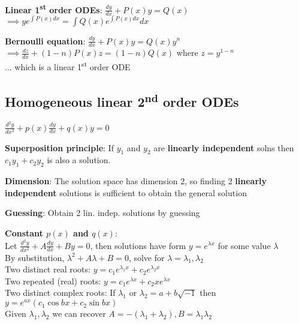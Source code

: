 \documentclass[a4paper,landscape]{article}
\newcommand{\rnsubtopic}[1]{\subsection*{#1}}
\newcommand{\rnname}[1]{\textbf{#1}}
\newcommand{\rnor}{\textrm{ or }}
\begin{document}
\begin{multicols*}{3}
\begin{flatitemize}
\item \rnname{Linear 1\textsuperscript{st} order ODEs}: $\displaystyle\frac{dy}{dx}+P(x)y=Q(x)$ $\displaystyle \implies ye^{\int P(x) dx}=\int Q(x)e^{\int P(x) dx}dx$

\item \rnname{Bernoulli equation}: $\displaystyle \frac{dy}{dx}+P(x)y=Q(x)y^n$ $\displaystyle\implies \frac{dz}{dx}+(1-n)P(x)z=(1-n)Q(x)$ where $z=y^{1-n}$ \\ ... which is a linear 1\textsuperscript{st} order ODE

\end{flatitemize}

\rnsubtopic{Homogeneous linear 2\textsuperscript{nd} order ODEs}

$\displaystyle\frac{d^2y}{dx^2}+p(x)\frac{dy}{dx}+q(x)y=0$

\begin{flatitemize}

\item \rnname{Superposition principle}: If $y_1$ and $y_2$ are \textbf{linearly independent} solns then $c_1y_1+c_2y_2$ is also a solution.

\item \rnname{Dimension}: The solution space has dimension 2, so finding 2 \textbf{linearly independent} solutions is sufficient to obtain the general solution

\item \rnname{Guessing}: Obtain 2 lin. indep. solutions by guessing

\item \rnname{Constant $p(x)$ and $q(x)$}: \\
Let $\displaystyle\frac{d^2y}{dx^2}+A\frac{dy}{dx}+By=0$, then solutions have form $y=e^{\lambda x}$ for some value $\lambda$ \\
By substitution, $\lambda^2+A\lambda+B=0$, solve for $\lambda=\lambda_1,\lambda_2$ \\
Two distinct real roots: $y=c_1e^{\lambda_1x}+c_2e^{\lambda_2x}$ \\
Two repeated (real) roots: $y=c_1e^{\lambda x}+c_2xe^{\lambda x}$ \\
Two distinct complex roots: If $\displaystyle \lambda_1 \rnor \lambda_2=a+b\sqrt{-1}$ then $\displaystyle y=e^{ax}\left(c_1 \cos bx + c_2 \sin bx\right)$ \\
\vspace{0.4em}
Given $\lambda_1, \lambda_2$ we can recover $A=-(\lambda_1+\lambda_2), B=\lambda_1\lambda_2$



\end{flatitemize}
\end{multicols*}
\end{document}
